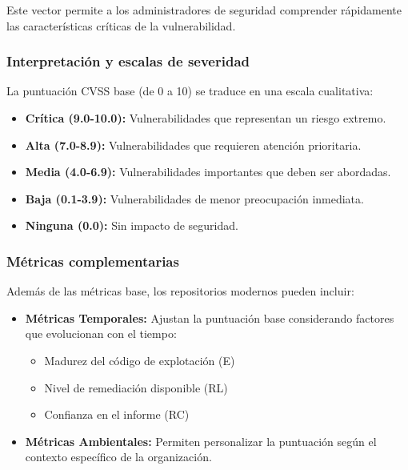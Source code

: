 {\begin{itemize}
    Este vector permite a los administradores de seguridad comprender rápidamente las características críticas de la vulnerabilidad.
\end{itemize}

\subsubsection{Interpretación y escalas de severidad}

La puntuación CVSS base (de 0 a 10) se traduce en una escala cualitativa:

\begin{itemize}
    \item \textbf{Crítica (9.0-10.0):} Vulnerabilidades que representan un riesgo extremo.
    \item \textbf{Alta (7.0-8.9):} Vulnerabilidades que requieren atención prioritaria.
    \item \textbf{Media (4.0-6.9):} Vulnerabilidades importantes que deben ser abordadas.
    \item \textbf{Baja (0.1-3.9):} Vulnerabilidades de menor preocupación inmediata.
    \item \textbf{Ninguna (0.0):} Sin impacto de seguridad.
\end{itemize}

\subsubsection{Métricas complementarias}

Además de las métricas base, los repositorios modernos pueden incluir:

\begin{itemize}
    \item \textbf{Métricas Temporales:} Ajustan la puntuación base considerando factores que evolucionan con el tiempo:
    \begin{itemize}
        \item Madurez del código de explotación (E)
        \item Nivel de remediación disponible (RL)
        \item Confianza en el informe (RC)
    \end{itemize}
    
    \item \textbf{Métricas Ambientales:} Permiten personalizar la puntuación según el contexto específico de la organización.
\end{itemize}

}
